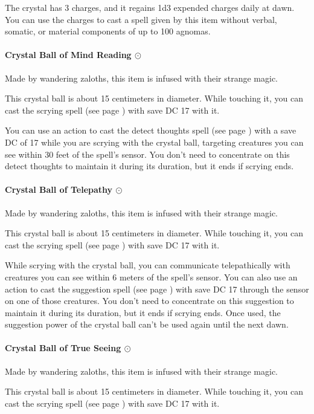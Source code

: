         The crystal has 3 charges, and it regains 1d3 expended charges daily at dawn.
        You can use the charges to cast a spell given by this item without verbal, somatic, or material components of up to 100 agnomas.
    \paragraph{Crystal Ball of Mind Reading $\odot$}
        Made by wandering zaloths, this item is infused with their strange magic.

        This crystal ball is about 15 centimeters in diameter.
        While touching it, you can cast the scrying spell (see page \pageref{spell::scrying}) with save DC 17 with it.

        You can use an action to cast the detect thoughts spell (see page \pageref{spell::detectthoughts}) with a save DC of 17 while you are scrying with the crystal ball, targeting creatures you can see within 30 feet of the spell's sensor.
        You don't need to concentrate on this detect thoughts to maintain it during its duration, but it ends if scrying ends.
    \paragraph{Crystal Ball of Telepathy $\odot$}
        Made by wandering zaloths, this item is infused with their strange magic.

        This crystal ball is about 15 centimeters in diameter.
        While touching it, you can cast the scrying spell (see page \pageref{spell::scrying}) with save DC 17 with it.

        While scrying with the crystal ball, you can communicate telepathically with creatures you can see within 6 meters of the spell's sensor.
        You can also use an action to cast the suggestion spell (see page \pageref{spell::suggestion}) with save DC 17 through the sensor on one of those creatures.
        You don't need to concentrate on this suggestion to maintain it during its duration, but it ends if scrying ends.
        Once used, the suggestion power of the crystal ball can't be used again until the next dawn.
    \paragraph{Crystal Ball of True Seeing $\odot$}
        Made by wandering zaloths, this item is infused with their strange magic.

        This crystal ball is about 15 centimeters in diameter.
        While touching it, you can cast the scrying spell (see page \pageref{spell::scrying}) with save DC 17 with it.


